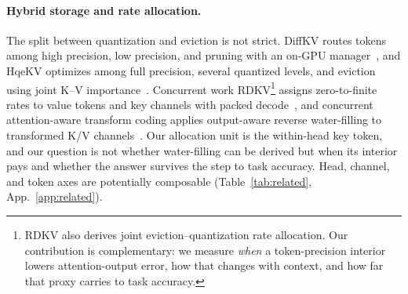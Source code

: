 \documentclass{article}
\theoremstyle{definition}
\begin{document}
\paragraph{Hybrid storage and rate allocation.}
The split between quantization and eviction is not strict.  DiffKV routes tokens among high precision, low precision, and pruning with an on-GPU manager~\citep{zhang2025diffkv}, and HqeKV optimizes among full precision, several quantized levels, and eviction using joint K--V importance~\citep{wang-etal-2026-hqekv}.  
Concurrent work RDKV\footnote{RDKV also derives joint eviction--quantization rate allocation.  Our contribution is complementary: we measure \emph{when} a token-precision interior lowers attention-output error, how that changes with context, and how far that proxy carries to task accuracy.
} assigns zero-to-finite rates to value tokens and key channels with packed decode~\citep{zhang2026rdkv}, and concurrent attention-aware transform coding applies output-aware reverse water-filling to transformed K/V channels~\citep{laus2026aatc}.  
Our allocation unit is the within-head key token, and our question is not whether water-filling can be derived but when its interior pays and whether the answer survives the step to task accuracy.  Head, channel, and token axes are potentially composable (Table~\ref{tab:related}, App.~\ref{app:related}).
\end{document}
